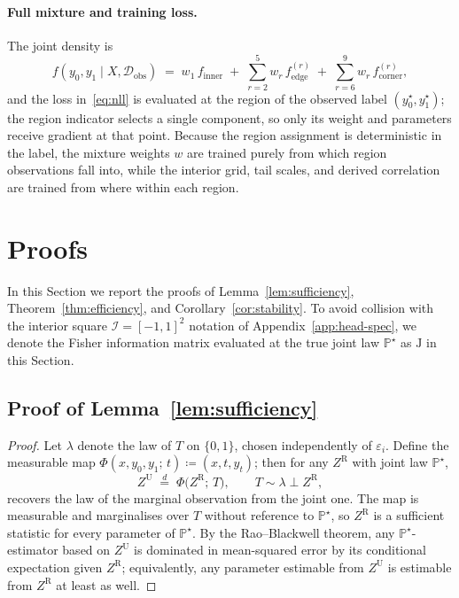 \documentclass[11pt]{article}
\newcommand{\PP}{\mathbb{P}}
\begin{document}
\paragraph{Full mixture and training loss.}
The joint density is
\begin{equation}
  f(y_{0}, y_{1} \mid X, \mathcal{D}_{\mathrm{obs}})
  \;=\;
  w_{1}\, f_{\mathrm{inner}}
  \;+\; \sum_{r = 2}^{5} w_{r}\, f^{(r)}_{\mathrm{edge}}
  \;+\; \sum_{r = 6}^{9} w_{r}\, f^{(r)}_{\mathrm{corner}},
  \label{eq:full-density}
\end{equation}
and the loss in~\eqref{eq:nll} is evaluated at the region of the
observed label $(y_{0}^{\star}, y_{1}^{\star})$; the region indicator
selects a single component, so only its weight and parameters receive
gradient at that point. Because the region assignment is deterministic
in the label, the mixture weights $w$ are trained purely from which
region observations fall into, while the interior grid, tail scales,
and derived correlation are trained from where within each region.

\section{Proofs}
\label{app:proofs}

In this Section we report the proofs of Lemma~\ref{lem:sufficiency},
Theorem~\ref{thm:efficiency}, and Corollary~\ref{cor:stability}. To avoid collision with the interior square $\mathcal{I} = [-1, 1]^{2}$ notation of Appendix~\ref{app:head-spec}, we denote the Fisher
information matrix evaluated at the true joint law $\PP^{\star}$ as 
$\mathrm{J}$ in this Section.

\subsection{Proof of Lemma~\ref{lem:sufficiency}}

\begin{proof}
Let $\lambda$ denote the law of $T$ on $\{0, 1\}$, chosen independently
of $\varepsilon_{i}$. Define the measurable map
$\Phi(x, y_{0}, y_{1};\, t) \coloneqq (x, t, y_{t})$; then for any
$Z^{\mathrm{R}}$ with joint law $\PP^{\star}$,
\begin{equation*}
  Z^{\mathrm{U}} \;\overset{d}{=}\; \Phi\!\bigl(Z^{\mathrm{R}};\, T\bigr),
  \qquad T \sim \lambda \perp Z^{\mathrm{R}},
\end{equation*}
recovers the law of the marginal observation from the joint one. The
map is measurable and marginalises over $T$ without reference to
$\PP^{\star}$, so $Z^{\mathrm{R}}$ is a sufficient statistic for every
parameter of $\PP^{\star}$. By the Rao--Blackwell theorem, any
$\PP^{\star}$-estimator based on $Z^{\mathrm{U}}$ is dominated in
mean-squared error by its conditional expectation given
$Z^{\mathrm{R}}$; equivalently, any parameter estimable from
$Z^{\mathrm{U}}$ is estimable from $Z^{\mathrm{R}}$ at least as well.
\end{proof}
\end{document}
